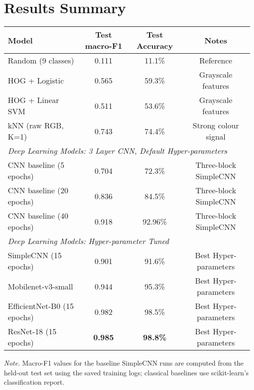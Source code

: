 \documentclass[11pt,a4paper]{article}
\begin{document}
\section{Results Summary}
\begin{center}
\begin{tabular}{lccc}
\toprule
Model & Test macro-F1 & Test Accuracy & Notes \\
\midrule
Random (9 classes) & 0.111& 11.1\% & Reference \\
HOG + Logistic & 0.565& 59.3\% & Grayscale features\\
HOG + Linear SVM & 0.511& 53.6\% & Grayscale features\\
kNN (raw RGB, K=1) & 0.743& 74.4\% & Strong colour signal \\
\midrule
\multicolumn{4}{l}{\textit{Deep Learning Models: 3 Layer CNN, Default Hyper-parameters}} \\[2pt]
\midrule
CNN baseline (5 epochs) & 0.704 & 72.3\% & Three-block SimpleCNN \\
CNN baseline (20 epochs) & 0.836 & 84.5\% & Three-block SimpleCNN \\
CNN baseline (40 epochs) & 0.918 & 92.96\% & Three-block SimpleCNN \\
\midrule
\multicolumn{4}{l}{\textit{Deep Learning Models: Hyper-parameter Tuned}} \\[2pt]
\midrule
SimpleCNN (15 epochs) & 0.901 & 91.6\% & Best Hyper-parameters \\
Mobilenet-v3-small & 0.944 & 95.3\% & Best Hyper-parameters \\
EfficientNet-B0 (15 epochs) & 0.982 & 98.5\% & Best Hyper-parameters \\
ResNet-18 (15 epochs) & \textbf{0.985} & \textbf{98.8\%} & Best Hyper-parameters \\
\bottomrule
\end{tabular}
\end{center}
\smallskip
\noindent\textit{Note.} Macro-F1 values for the baseline SimpleCNN runs are computed from the held-out test set using the saved training logs; classical baselines use scikit-learn's classification report.
\end{document}
